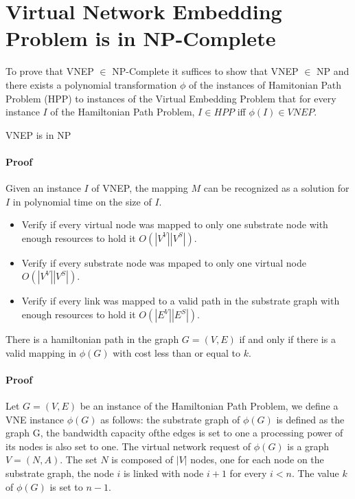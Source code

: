 
\section{Virtual Network Embedding Problem is in NP-Complete}
To prove that VNEP $\in$ NP-Complete it suffices to show that VNEP $\in$ NP and there exists a polynomial transformation $\phi$ of the instances of Hamitonian Path Problem (HPP) to instances of the Virtual Embedding Problem that for every instance $I$ of the Hamiltonian Path Problem, $I \in HPP$ iff $\phi(I) \in VNEP$.

\begin{theorem}
  VNEP is in NP
\end{theorem}

\paragraph{Proof} Given an instance $I$ of VNEP, the mapping $M$ can be recognized as a solution for $I$ in polynomial time on the size of $I$.
\begin{itemize}
  \item Verify if every virtual node was mapped to only one substrate node with enough resources to hold it $O(|V^{V}||V^{S}|)$.
  \item Verify if every substrate node was mpaped to only one virtual node $O(|V^{V}||V^{S}|)$.
  \item Verify if every link was mapped to a valid path in the substrate graph with enough resources to hold it $O(|E^{V}||E^{S}|)$.
\end{itemize}

\begin{theorem}
  There is a hamiltonian path in the graph $G=(V,E)$ if and only if there is a valid mapping in $\phi(G)$ with cost less than or equal to $k$.
\end{theorem}

\paragraph{Proof} Let $G=(V,E)$ be an instance of the Hamiltonian Path Problem, we define a VNE instance $\phi(G)$ as follows: the substrate graph of $\phi(G)$ is defined as the graph G, the bandwidth capacity ofthe edges is set to one a processing power of its nodes is also set to one. The virtual network request of $\phi(G)$ is a graph $V=(N,A)$. The set $N$ is composed of $|V|$ nodes, one for each node on the substrate graph, the node $i$ is linked with node $i+1$ for every $i < n$. The value $k$ of $\phi(G)$ is set to $n-1$.

